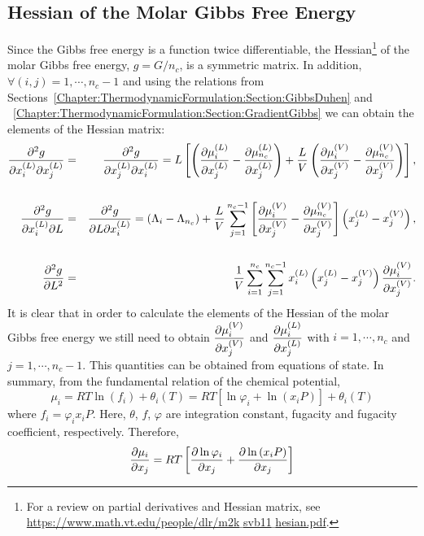 \subsection{Hessian of the Molar Gibbs Free Energy}\label{Chapter:ThermodynamicFormulation:Section:HessianGibbs}
Since the Gibbs free energy is a function twice differentiable, the Hessian\footnote{For a review on partial derivatives and Hessian matrix, see \href{https://www.math.vt.edu/people/dlr/m2k_svb11_hesian.pdf}{https://www.math.vt.edu/people/dlr/m2k$\_$svb11$\_$hesian.pdf}.} of the molar Gibbs free energy, $g=G/n_{c}$, is a symmetric matrix. In addition, $\forall (i,j)=1, \cdots, n_{c}-1$ and using the relations from Sections~\ref{Chapter:ThermodynamicFormulation:Section:GibbsDuhen} and ~\ref{Chapter:ThermodynamicFormulation:Section:GradientGibbs} we can obtain the elements of the Hessian matrix:
\begin{eqnarray}
   \frc{\partial^{2}g}{\partial\mfr[x]{i}{L}\partial\mfr[x]{j}{L}} &=& \frc{\partial^{2}g}{\partial\mfr[x]{j}{L}\partial\mfr[x]{i}{L}} = L\left[\left(\frc{\partial\mfr[\mu]{i}{L}}{\partial\mfr[x]{j}{L}} - \frc{\partial\mfr[\mu]{n_{c}}{L}}{\partial\mfr[x]{j}{L}}\right) + \frc{L}{V}\left(\frc{\partial\mfr[\mu]{i}{V}}{\partial\mfr[x]{j}{V}} - \frc{\partial\mfr[\mu]{n_{c}}{V}}{\partial\mfr[x]{j}{V}}\right)\right], \\
              && \nonumber \\
   \frc{\partial^{2}g}{\partial\mfr[x]{i}{L}\partial L} &=& \frc{\partial^{2}g}{\partial L\partial\mfr[x]{i}{L}} = \left(\Lambda_{i}-\Lambda_{n_{c}}\right) + \frc{L}{V} \summation_{j=1}^{n_{c}-1}\left[\frc{\partial\mfr[\mu]{i}{V}}{\partial\mfr[x]{j}{V}} - \frc{\partial\mfr[\mu]{n_{c}}{V}}{\partial\mfr[x]{j}{V}}\right]\left(\mfr[x]{j}{L}-\mfr[x]{j}{V}\right), \\
              && \nonumber \\
    \frc{\partial^{2}g}{\partial L^{2}} &=& \frc{1}{V}\summation_{i=1}^{n_{c}}\summation_{j=1}^{n_{c}-1}\mfr[x]{i}{L}\left(\mfr[x]{j}{L}-\mfr[x]{j}{V}\right)\frc{\partial\mfr[\mu]{i}{V}}{\partial\mfr[x]{j}{V}}.
\end{eqnarray}
It is clear that in order to calculate the elements of the Hessian of the molar Gibbs free energy we still need to obtain $\frc{\partial\mfr[\mu]{i}{V}}{\partial\mfr[x]{j}{V}}$ and $\frc{\partial\mfr[\mu]{i}{L}}{\partial\mfr[x]{j}{L}}$ with $i=1, \cdots, n_{c}$ and $j=1, \cdots, n_{c}-1$. This quantities can be obtained from equations of state. In summary, from the fundamental relation of the chemical potential,
\begin{equation}
   \mu_{i} = RT\ln\left(f_{i}\right) + \theta_{i}(T) = RT\left[\ln\varphi_{i} + \ln\left(x_{i}P\right)\right] + \theta_{i}(T)
\end{equation}
where $f_{i}=\varphi_{i}x_{i}P$. Here, $\theta$, $f$, $\varphi$ are integration constant, fugacity and fugacity coefficient, respectively. Therefore,
\begin{equation}
   \frc{\partial\mu_{i}}{\partial x_{j}} = RT\left[\frc{\partial\ln\varphi_{i}}{\partial x_{j}} + \frc{\partial\ln\left(x_{i}P\right)}{\partial x_{j}}\right]
\end{equation}

